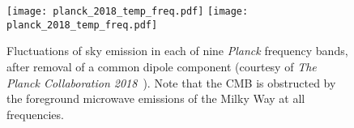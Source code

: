\begin{figure}[htpb]
	\centering\capstart{}
	\texttt{[image: planck\_2018\_temp\_freq.pdf]}
	\texttt{[image: planck\_2018\_temp\_freq.pdf]}
	\caption[
		The 2018 \emph{Planck} maps in intensity in each frequency band
	]{
		Fluctuations of sky emission in each of nine \emph{Planck} frequency bands, after removal of a common dipole component (courtesy of \emph{The Planck Collaboration 2018}~\cite{Planck2020}).
		Note that the CMB is obstructed by the foreground microwave emissions of the Milky Way at all frequencies.
	}\label{fig:chapter2_planck_frequency}
\end{figure}
